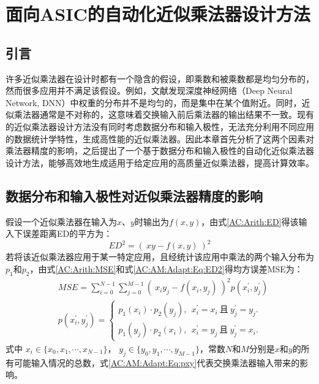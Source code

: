 \chapter{面向ASIC的自动化近似乘法器设计方法}

\section{引言}

许多近似乘法器在设计时都有一个隐含的假设，即乘数和被乘数都是均匀分布的，然而很多应用并不满足该假设。例如，文献\cite{DNN:WeightAnalysis2}发现深度神经网络（Deep Neural Network, DNN）中权重的分布并不是均匀的，而是集中在某个值附近。同时，近似乘法器通常是不对称的，这意味着交换输入前后乘法器的输出结果不一致。现有的近似乘法器设计方法没有同时考虑数据分布和输入极性，无法充分利用不同应用的数据统计学特性，生成高性能的近似乘法器。因此本章首先分析了这两个因素对乘法器精度的影响，之后提出了一个基于数据分布和输入极性的自动化近似乘法器设计方法，能够高效地生成适用于给定应用的高质量近似乘法器，提高计算效率。


\section{数据分布和输入极性对近似乘法器精度的影响}

假设一个近似乘法器在输入为$x$、$y$时输出为$f(x,y)$，由式\eqref{AC:Arith:ED}得该输入下误差距离ED的平方为：
\begin{equation}
    ED^2 = ( \ xy - f(x,y) \ ) ^2
\label{AC:AM:Adapt:Eq:ED2}
\end{equation}
若将该近似乘法器应用于某一特定应用，且经统计该应用中乘法的两个输入分布为$p_1$和$p_2$，由式\eqref{AC:Arith:MSE}和式\eqref{AC:AM:Adapt:Eq:ED2}得均方误差MSE为：
\begin{align}
    & MSE = \sum_{i=0}^{N-1} \sum_{j=0}^{M-1} ( \ x_i y_j - f(x_i,y_j) \ ) ^2 p(x^{\prime}_i, y^{\prime}_j) \label{AC:AM:Adapt:Eq:MSE} \\
    & p(x^{\prime}_i, y^{\prime}_j) = \left\{
        \begin{aligned}
          p_1(x_i) \cdot p_2(y_j),\ \ x^{\prime}_i=x_i\ \text{且}\ y^{\prime}_j=y_j. \\
          p_1(y_j) \cdot p_2(x_i),\ \ x^{\prime}_i=y_j\ \text{且}\ y^{\prime}_j=x_i.
        \end{aligned}
        \right.      \label{AC:AM:Adapt:Eq:pxy}
\end{align}
式中 $x_i \in \{x_0, x_1, \cdots , x_{N-1}\}$， $y_j \in \{y_0, y_1, \cdots , y_{M-1}\}$，常数$N$和$M$分别是$x$和$y$的所有可能输入情况的总数，式\eqref{AC:AM:Adapt:Eq:pxy}代表交换乘法器输入带来的影响。

